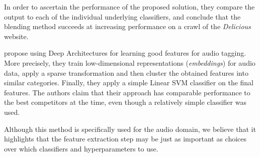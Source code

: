 In order to ascertain the performance of the proposed solution, they compare the output to each of the individual underlying classifiers, and conclude that the blending method succeeds at increasing performance on a crawl of the \textit{Delicious} website.

\cite{sattigeri_etal_2014} propose using Deep Architectures for learning good features for audio tagging. More precisely, they train low-dimensional representations (\textit{embeddings}) for audio data, apply a sparse transformation and then cluster the obtained features into similar categories. Finally, they apply a simple Linear SVM classifier on the final features. The authors claim that their approach has comparable performance to the best competitors at the time, even though a relatively simple classifier was used.

Although this method is specifically used for the audio domain, we believe that it highlights that the feature extraction step may be just as important as choices over which classifiers and hyperparameters to use.